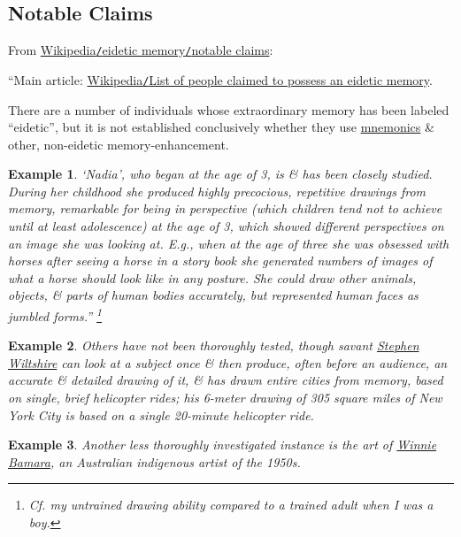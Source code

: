 \documentclass[oneside]{book}
\numberwithin{equation}{section}
\newtheorem{example}{Example}[chapter]
\begin{document}
\subsection{Notable Claims}
From \href{https://en.wikipedia.org/wiki/Eidetic_memory#Notable_claims}{Wikipedia\texttt{/}eidetic memory\texttt{/}notable claims}:

``Main article: \href{https://en.wikipedia.org/wiki/List_of_people_claimed_to_possess_an_eidetic_memory}{Wikipedia\texttt{/}List of people claimed to possess an eidetic memory}.

There are a number of individuals whose extraordinary memory has been labeled ``eidetic'', but it is not established conclusively whether they use \href{https://en.wikipedia.org/wiki/Mnemonic}{mnemonics} \& other, non-eidetic memory-enhancement.

\begin{example}
	`Nadia', who began  at the age of 3, is  \& has been closely studied. During her childhood she produced highly precocious, repetitive drawings from memory, remarkable for being in perspective (which children tend not to achieve until at least adolescence) at the age of 3, which showed different perspectives on an image she was looking at. E.g., when at the age of three she was obsessed with horses after seeing a horse in a story book she generated numbers of images of what a horse should look like in any posture. She could draw other animals, objects, \& parts of human bodies accurately, but represented human faces as jumbled forms.'' \footnote{Cf. my untrained drawing ability compared to a trained adult when I was a boy.}
\end{example}

\begin{example}
	Others have not been thoroughly tested, though savant \href{https://en.wikipedia.org/wiki/Stephen_Wiltshire}{Stephen Wiltshire} can look at a subject once \& then produce, often before an audience, an accurate \& detailed drawing of it, \& has drawn entire cities from memory, based on single, brief helicopter rides; his 6-meter drawing of 305 square miles of New York City is based on a single 20-minute helicopter ride.
\end{example}

\begin{example}
	Another less thoroughly investigated instance is the art of \href{https://en.wikipedia.org/wiki/Winnie_Bamara}{Winnie Bamara}, an Australian indigenous artist of the 1950s.
\end{example}
\end{document}
